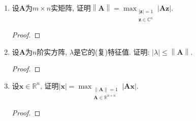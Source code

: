 \begin{2a}
\begin{enumerate}
\item 设\(\boldsymbol{A}\)为\(m\times n\)实矩阵, 
证明\(\left\|\boldsymbol{A}\right\|
=\max_{\substack{|\boldsymbol{z}|=1\\ \boldsymbol{z}\in\mathbb{C}^{n}}}|\boldsymbol{Az}|\).
\begin{proof}

\end{proof}

\item 设\(\boldsymbol{A}\)为\(n\)阶实方阵, \(\lambda\)是它的(复)特征值. 
证明: \(|\lambda|\leqslant\left\|\boldsymbol{A}\right\|\).
\begin{proof}

\end{proof}

\item 设\(\boldsymbol{x}\in\mathbb{R}^n\), 证明\(|\boldsymbol{x}|
=\max_{\substack{\|\boldsymbol{A}\|=1\\\boldsymbol{A}\in\mathbb{R}^{n\times n}}}|\boldsymbol{Ax}|.\)
\begin{proof}

\end{proof}


\end{enumerate}
\end{2a}
